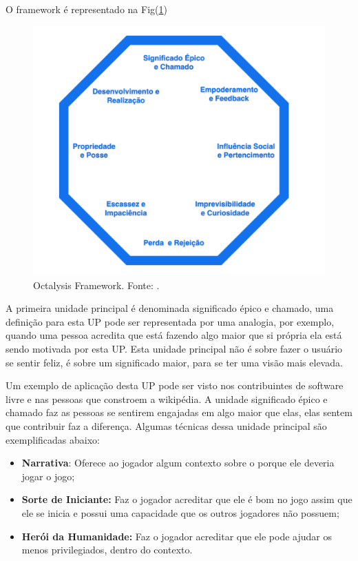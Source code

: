  O framework é representado na Fig(\ref{octfig})

\begin{figure}[h]
	\centering
		\includegraphics[keepaspectratio=true,scale=0.5]{figuras/octfig.png}
	\caption{Octalysis Framework. Fonte:  \cite{chou2015actionable}.\label{octfig}
}
\end{figure}

\newpage

A primeira unidade principal é denominada significado épico e chamado, uma definição para esta UP pode ser representada por uma analogia, por exemplo, quando uma pessoa acredita que está fazendo algo maior que si própria ela está sendo motivada por esta UP. Esta unidade principal não é sobre fazer o usuário se sentir feliz, é sobre um significado maior, para se ter uma visão mais elevada. 

Um exemplo de aplicação desta UP pode ser visto nos contribuintes de software livre e nas pessoas que constroem a wikipédia. A unidade significado épico e chamado faz as pessoas se sentirem engajadas em algo maior que elas, elas sentem que contribuir faz a diferença. Algumas técnicas dessa unidade principal são exemplificadas abaixo:

\begin{itemize}
\item  \textbf{Narrativa}: Oferece ao jogador algum contexto sobre o porque ele deveria jogar o jogo;
\item  \textbf{Sorte de Iniciante:} Faz o jogador acreditar que ele é bom no jogo assim que ele se inicia e possui uma capacidade que os outros jogadores não possuem;
\item  \textbf{Herói da Humanidade:} Faz o jogador acreditar que ele pode ajudar os menos privilegiados, dentro do contexto.
\end{itemize}

